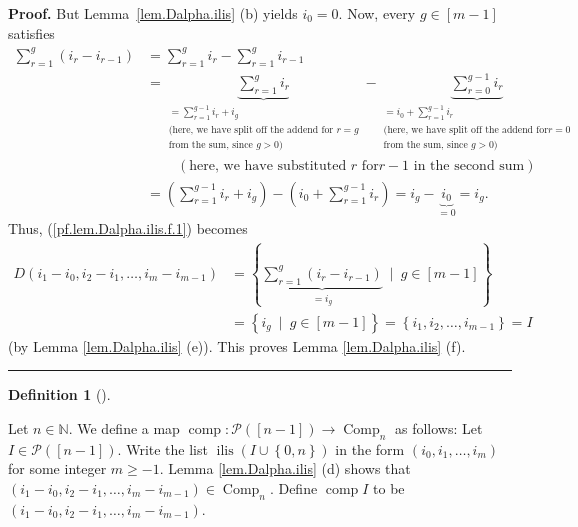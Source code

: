 \documentclass[numbers=enddot,12pt,final,onecolumn,notitlepage,abstracton]{scrartcl}
\theoremstyle{definition}
\newtheorem{defi}[theo]{Definition}
\newenvironment{definition}[1][]
{\begin{defi}[#1]\begin{leftbar}}
{\end{leftbar}\end{defi}}
\newenvironment{proof}[1][Proof]{\noindent\textbf{#1.} }{\ \rule{0.5em}{0.5em}}
\let\sumnonlimits\sum
\renewcommand{\sum}{\sumnonlimits\limits}
\newenvironment{verlong}{}{}
\begin{document}
\begin{verlong}
\begin{footnotesize}
\begin{proof}
But Lemma~\ref{lem.Dalpha.ilis} (b) yields $i_{0} = 0$. Now, every
$g\in\left[  m-1\right]  $ satisfies%
\begin{align}
\sum_{r=1}^{g}\left(  i_{r}-i_{r-1}\right)   &  =\sum_{r=1}^{g}i_{r}%
-\sum_{r=1}^{g}i_{r-1}\nonumber\\
&  =\underbrace{\sum_{r=1}^{g}i_{r}}_{\substack{=\sum_{r=1}^{g-1}i_{r}%
+i_{g}\\\text{(here, we have split off the addend for }r=g\\\text{from the
sum, since }g>0\text{)}}}-\underbrace{\sum_{r=0}^{g-1}i_{r}}_{\substack{=i_{0}%
+\sum_{r=1}^{g-1}i_{r}\\\text{(here, we have split off the addend for
}r=0\\\text{from the sum, since }g>0\text{)}}}\nonumber\\
&  \ \ \ \ \ \ \ \ \ \ \left(  \text{here, we have substituted }r\text{ for
}r-1\text{ in the second sum}\right) \nonumber\\
&  =\left(  \sum_{r=1}^{g-1}i_{r}+i_{g}\right)  -\left(  i_{0}+\sum
_{r=1}^{g-1}i_{r}\right)  =i_{g}-\underbrace{i_{0}}_{=0}=i_{g}.\nonumber
\end{align}
Thus, (\ref{pf.lem.Dalpha.ilis.f.1}) becomes%
\begin{align*}
D\left(  i_{1}-i_{0},i_{2}-i_{1},\ldots,i_{m}-i_{m-1}\right)   &  =\left\{
\underbrace{\sum_{r=1}^{g}\left(  i_{r}-i_{r-1}\right)  }_{=i_{g}}\ \mid
\ g\in\left[  m-1\right]  \right\} \\
&  =\left\{  i_{g}\ \mid\ g\in\left[  m-1\right]  \right\}  =\left\{
i_{1},i_{2},\ldots,i_{m-1}\right\}  =I
\end{align*}
(by Lemma \ref{lem.Dalpha.ilis} (e)). This proves Lemma \ref{lem.Dalpha.ilis} (f).
\end{proof}

\begin{definition}
\label{def.Dalpha.comp}Let $n\in\mathbb{N}$. We define a map
$\operatorname*{comp}:\mathcal{P}\left(  \left[  n-1\right]  \right)
\rightarrow\operatorname*{Comp}\nolimits_{n}$ as follows: Let $I\in
\mathcal{P}\left(  \left[  n-1\right]  \right)  $. Write the list
$\operatorname*{ilis}\left(  I\cup\left\{  0,n\right\}  \right)  $ in the form
$\left(  i_{0},i_{1},\ldots,i_{m}\right)  $ for some integer $m\geq-1$. Lemma
\ref{lem.Dalpha.ilis} (d) shows that $\left(  i_{1}-i_{0},i_{2}-i_{1}%
,\ldots,i_{m}-i_{m-1}\right)  \in\operatorname*{Comp}\nolimits_{n}$. Define
$\operatorname*{comp}I$ to be $\left(  i_{1}-i_{0},i_{2}-i_{1},\ldots
,i_{m}-i_{m-1}\right)  $.


\end{definition}
\end{footnotesize}
\end{verlong}
\end{document}
